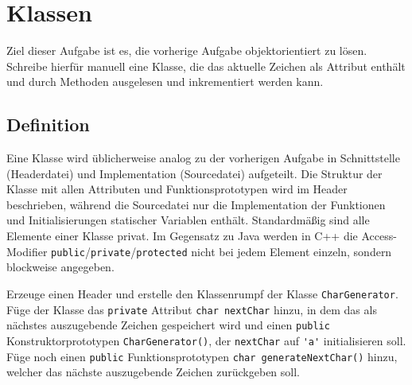 \section{\ExercisePrefixBasics Klassen}
Ziel dieser Aufgabe ist es, die vorherige Aufgabe objektorientiert zu lösen. Schreibe hierfür manuell eine Klasse, die das aktuelle Zeichen als Attribut enthält und durch Methoden ausgelesen und inkrementiert werden kann.


\subsection{Definition}
Eine Klasse wird üblicherweise analog zu der vorherigen Aufgabe in Schnittstelle (Headerdatei) und Implementation (Sourcedatei) aufgeteilt.
Die Struktur der Klasse mit allen Attributen und Funktionsprototypen wird im Header beschrieben, während die Sourcedatei nur die Implementation der Funktionen und Initialisierungen statischer Variablen enthält.
Standardmäßig sind alle Elemente einer Klasse privat.
Im Gegensatz zu Java werden in C++ die Access-Modifier \lstinline{public}/\lstinline{private}/\lstinline{protected} nicht bei jedem Element einzeln, sondern blockweise angegeben.


Erzeuge einen Header  und erstelle den Klassenrumpf der Klasse \lstinline{CharGenerator}.
Füge der Klasse das \lstinline{private} Attribut \lstinline{char nextChar} hinzu, in dem das als nächstes auszugebende Zeichen gespeichert wird und einen \lstinline{public} Konstruktorprototypen \lstinline{CharGenerator()}, der \lstinline{nextChar} auf \lstinline{'a'} initialisieren soll.
Füge noch einen \lstinline{public} Funktionsprototypen \lstinline{char generateNextChar()} hinzu, welcher das nächste auszugebende Zeichen zurückgeben soll.





